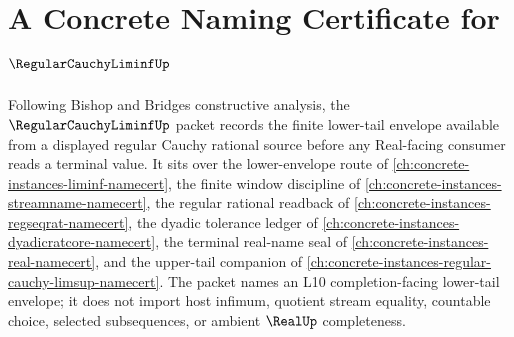 \chapter{A Concrete Naming Certificate for $\RegularCauchyLiminfUp$}
\label{ch:concrete-instances-regular-cauchy-liminf-namecert}

Following Bishop and Bridges constructive analysis, the $\RegularCauchyLiminfUp$ packet records the finite lower-tail envelope available from a displayed regular Cauchy rational source before any Real-facing consumer reads a terminal value. It sits over the lower-envelope route of \autoref{ch:concrete-instances-liminf-namecert}, the finite window discipline of \autoref{ch:concrete-instances-streamname-namecert}, the regular rational readback of \autoref{ch:concrete-instances-regseqrat-namecert}, the dyadic tolerance ledger of \autoref{ch:concrete-instances-dyadicratcore-namecert}, the terminal real-name seal of \autoref{ch:concrete-instances-real-namecert}, and the upper-tail companion of \autoref{ch:concrete-instances-regular-cauchy-limsup-namecert}. The packet names an L10 completion-facing lower-tail envelope; it does not import host infimum, quotient stream equality, countable choice, selected subsequences, or ambient $\RealUp$ completeness.

